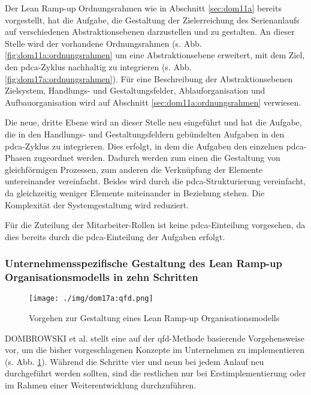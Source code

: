 Der Lean Ramp-up Ordnungsrahmen wie in Abschnitt \ref{sec:dom11a} bereits vorgestellt, hat die Aufgabe, die Gestaltung der Zielerreichung des Serienanlaufs auf verschiedenen Abstraktionsebenen darzustellen und zu gestalten. 
An dieser Stelle wird der vorhandene Ordnungsrahmen (s. Abb. \ref{fig:dom11a:ordnungsrahmen} um eine Abstraktionsebene erweitert, mit dem Ziel, den \gls{pdca}-Zyklus nachhaltig zu integrieren (s. Abb. \ref{fig:dom17a:ordnungsrahmen}). 
Für eine Beschreibung der Abstraktionsebenen Zielsystem, Handlungs- und Gestaltungsfelder, Ablauforganisation und Aufbauorganisation wird auf Abschnitt \ref{sec:dom11a:ordnungsrahmen} verwiesen. 

Die neue, dritte Ebene wird an dieser Stelle neu eingeführt und hat die Aufgabe, die in den Handlungs- und Gestaltungsfeldern gebündelten Aufgaben in den \gls{pdca}-Zyklus zu integrieren. Dies erfolgt, in dem die Aufgaben den einzelnen \gls{pdca}-Phasen zugeordnet werden. Dadurch werden zum einen die Gestaltung von gleichförmigen Prozessen, zum anderen die Verknüpfung der Elemente untereinander vereinfacht. Beides wird durch die \gls{pdca}-Strukturierung vereinfacht, da gleichzeitig weniger Elemente miteinander in Beziehung stehen. Die Komplexität der Systemgestaltung wird reduziert. 

Für die Zuteilung der Mitarbeiter-Rollen ist keine \gls{pdca}-Einteilung vorgesehen, da dies bereits durch die \gls{pdca}-Einteilung der Aufgaben erfolgt. 


\subsubsection{Unternehmensspezifische Gestaltung des Lean Ramp-up Organisationsmodells in zehn Schritten}

\begin{figure}[ht]
 \centering
 \texttt{[image: ./img/dom17a:qfd.png]}
 \caption{Vorgehen zur Gestaltung eines Lean Ramp-up Organisationsmodells \cite{Dombrowski2017a}}
 \label{fig:dom17a:qfd}
\end{figure}

DOMBROWSKI et al. stellt eine auf der \gls{qfd}-Methode basierende Vorgehensweise vor, um die bisher vorgeschlagenen Konzepte im Unternehmen zu implementieren (s. Abb. \ref{fig:dom17a:qfd}). 
Während die Schritte vier und neun bei jedem Anlauf neu durchgeführt werden sollten, sind die restlichen nur bei Erstimplementierung oder im Rahmen einer Weiterentwicklung durchzuführen. 

